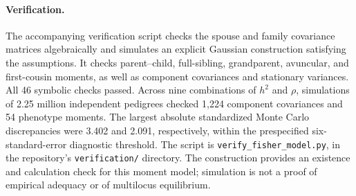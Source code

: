 \paragraph{Verification.}
The accompanying verification script checks the spouse and family
covariance matrices algebraically and simulates an explicit Gaussian
construction satisfying the assumptions. It checks parent--child,
full-sibling, grandparent, avuncular, and first-cousin moments, as well
as component covariances and stationary variances. All 46 symbolic checks passed. Across nine combinations of $h^2$ and
$\rho$, simulations of 2.25 million independent pedigrees checked 1,224
component covariances and 54 phenotype moments. The largest absolute
standardized Monte Carlo discrepancies were 3.402 and 2.091, respectively,
within the prespecified six-standard-error diagnostic threshold.
The script is \texttt{verify\_fisher\_model.py}, in the repository's
\texttt{verification/} directory. The construction
provides an existence and calculation check for this moment model;
simulation is not a proof of empirical adequacy or of multilocus
equilibrium.

